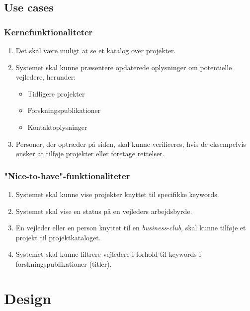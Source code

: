 \documentclass[12pt]{article}
\begin{document}
\subsection*{Use cases}

\subsubsection{Kernefunktionaliteter}
\label{sec:corefuncs}
\begin{enumerate}
	\item Det skal være muligt at se et katalog over projekter.
	\item Systemet skal kunne præsentere opdaterede oplysninger om potentielle vejledere, herunder:
	\begin{itemize}
		\item Tidligere projekter
		\item Forskningspublikationer
		\item Kontaktoplysninger
	\end{itemize}
	\item Personer, der optræder på siden, skal kunne verificeres, hvis de eksempelvis ønsker at tilføje projekter eller foretage rettelser.
\end{enumerate}

\subsubsection{"Nice-to-have"{}-funktionaliteter}
\label{sec:nicefuncs}
\begin{enumerate}
  \item Systemet skal kunne vise projekter knyttet til specifikke keywords.

  \item Systemet skal vise en status på en vejleders arbejdsbyrde.
  \item En vejleder eller en person knyttet til en \textit{business-club}, skal kunne tilføje et projekt til projektkataloget.

	\item Systemet skal kunne filtrere vejledere i forhold til keywords i forskningspublikationer (titler).
\end{enumerate}


\section{Design}
\label{sec:design}
\end{document}
